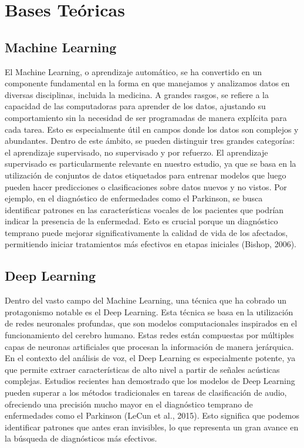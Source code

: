 \documentclass[listof=nochaptergap,12pt,times,authoryear]{report}
\begin{document}
\section{Bases Teóricas}

\subsection{Machine Learning}
El Machine Learning, o aprendizaje automático, se ha convertido en un componente fundamental en la forma en que manejamos y analizamos datos en diversas disciplinas, incluida la medicina. A grandes rasgos, se refiere a la capacidad de las computadoras para aprender de los datos, ajustando su comportamiento sin la necesidad de ser programadas de manera explícita para cada tarea. Esto es especialmente útil en campos donde los datos son complejos y abundantes. Dentro de este ámbito, se pueden distinguir tres grandes categorías: el aprendizaje supervisado, no supervisado y por refuerzo. El aprendizaje supervisado es particularmente relevante en nuestro estudio, ya que se basa en la utilización de conjuntos de datos etiquetados para entrenar modelos que luego pueden hacer predicciones o clasificaciones sobre datos nuevos y no vistos. Por ejemplo, en el diagnóstico de enfermedades como el Parkinson, se busca identificar patrones en las características vocales de los pacientes que podrían indicar la presencia de la enfermedad. Esto es crucial porque un diagnóstico temprano puede mejorar significativamente la calidad de vida de los afectados, permitiendo iniciar tratamientos más efectivos en etapas iniciales (Bishop, 2006).

\subsection{Deep Learning}
Dentro del vasto campo del Machine Learning, una técnica que ha cobrado un protagonismo notable es el Deep Learning. Esta técnica se basa en la utilización de redes neuronales profundas, que son modelos computacionales inspirados en el funcionamiento del cerebro humano. Estas redes están compuestas por múltiples capas de neuronas artificiales que procesan la información de manera jerárquica. En el contexto del análisis de voz, el Deep Learning es especialmente potente, ya que permite extraer características de alto nivel a partir de señales acústicas complejas. Estudios recientes han demostrado que los modelos de Deep Learning pueden superar a los métodos tradicionales en tareas de clasificación de audio, ofreciendo una precisión mucho mayor en el diagnóstico temprano de enfermedades como el Parkinson (LeCun et al., 2015). Esto significa que podemos identificar patrones que antes eran invisibles, lo que representa un gran avance en la búsqueda de diagnósticos más efectivos.
\end{document}
